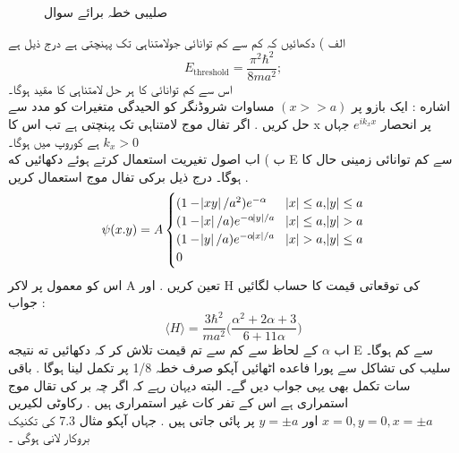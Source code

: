 \begin{figure}
\centering
{}
\caption{صلیبی خطہ برائے سوال }
\label{شکل_تغیریت_صلیبی_خطہ}
\end{figure}

الف ) دکھائیں کہ کم سے کم توانائی جولامتناہی تک پہنچتی ہے درج ذیل ہے
\[E_{\text{threshold}}=\frac{\pi^{2}\hbar^{2}}{8ma^{2}};\]
اس سے کم توانائی کا ہر حل لامتناہی کا مقید ہوگا۔\\
اشاره : ایک بازو پر
\((x>>a)\)
مساوات شروڈنگر کو الحیدگی متغیرات کو مدد سے حل کریں . اگر تفال موج لامتناہی تک پہنچتی ہے تب اس کا x پر انحصار
\(e^{ik_{x}x}\)
جہاں
\(k_{x}>0\)
ہے کوروپ میں ہوگا۔\\
ب ) اب اصول تغیریت استعمال کرتے ہوئے دکھائیں که E سے کم توانائی زمینی حال کا ہوگا۔ درج ذیل برکی تفال موج استعمال کریں .
\[\psi(x.y)=A\begin{cases}
(1-\abs{xy}/a^{2})e^{-\alpha} & \abs{x}\leq a,\abs{y}\leq a\\
(1-\abs{x}/a)e^{-\alpha\abs{y}/a} & \abs{x}\leq a ,\abs{y}> a\\
(1-\abs{y}/a)e^{-\alpha\abs{x}/a} & \abs{x}> a,\abs{y}\leq a\\
0\\
\end{cases}\]
اس کو معمول پر لاکر A تعین کریں . اور H کی توقعاتی قیمت کا حساب لگائیں\\
جواب :
\[\langle H \rangle=\frac{3\hbar^{2}}{ma^{2}}\big (\frac{\alpha^{2}+2\alpha+3}{6+11\alpha}\big )\]
اب
\(\alpha\)
کے لحاظ سے کم سے تم قیمت تلاش کر کہ دکھائیں ته نتیجه E سے کم ہوگا۔ سلیب کی تشاکل سے پورا فاعده اٹھائیں آپکو صرف خطہ
1/8
پر تکمل لینا ہوگا . باقی سات تکمل بھی یہی جواب دیں گے۔ البته دیہان رہے کہ اگر چہ بر کی تقال موج استمراری ہے اس کے تفر کات غیر استمراری ہیں . رکاوٹی لکیریں
\(x=0,y=0,x=\pm a\)
اور
\(y=\pm a\)
پر پائی جاتی ہیں . جہاں آپکو مثال 7.3 کی تکنیک بروکار لانی ہوگی ۔
